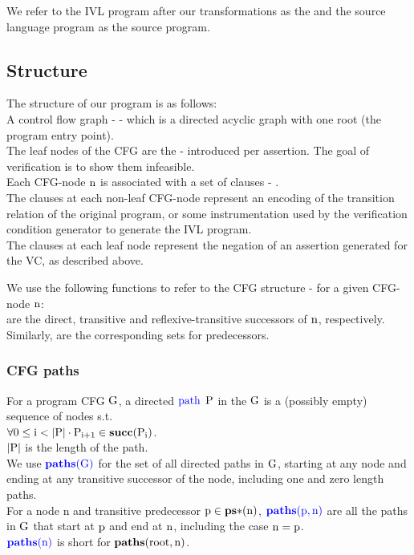 
\noindent
We refer to the IVL program after our transformations as the  and the source language program as the source program. 

\subsection*{Structure}
The structure of our program is as follows:\\
A control flow graph -  - which is a directed acyclic graph with one root (the program entry point).\\
The leaf nodes of the CFG are the  - introduced per assertion. The goal of verification is to show them infeasible.\\
Each CFG-node $\mathrm{n}$ is associated with a set of clauses - .\\ 
The clauses at each non-leaf CFG-node represent an encoding of the transition relation of the original program, or some instrumentation used by the verification condition generator to generate the IVL program.\\
The clauses at each leaf node represent the negation of an assertion generated for the VC, as described above.

\noindent
We use the following functions to refer to the CFG structure - for a given CFG-node $\mathrm{n}$:\\
 are the direct, transitive and reflexive-transitive successors of $\mathrm{n}$, respectively.\\
Similarly,  are the corresponding sets for predecessors.

\subsubsection*{CFG paths}
For a program CFG $\mathrm{G}$, a directed $\textcolor{blue}{\mathrm{path}}$ $\mathrm{P}$ in the $\mathrm{G}$ is a (possibly empty) sequence of nodes s.t. \\
$\mathrm{\forall 0 \leq i < \left|\mathrm{P}\right| \cdot P_{i+1} \in \mathbf{succ}(\mathrm{P_i})}$.\\
$\left|\mathrm{P}\right|$ is the length of the path.\\
We use $\newdef{\paths{G}{}}$ for the set of all directed paths in $\mathrm{G}$, starting at any node and ending at any transitive successor of the node, including one and zero length paths.\\
For a node n and transitive predecessor $\mathrm{p \in \mathbf{ps*}(\mathrm{n})}$,
$\newdef{\paths{p}{n}}$ are all the paths in $\mathrm{G}$ that start at $\mathrm{p}$ and end at $\mathrm{n}$, including the case $\mathrm{n=p}$.\\
$\newdef{\paths{n}{}}$ is short for $\paths{root}{n}$.

